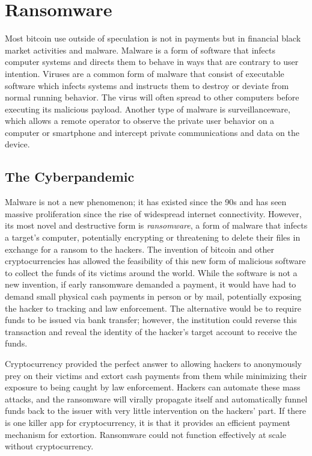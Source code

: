 \chapter{Ransomware}


Most bitcoin use outside of speculation is not in payments but in financial
black market activities and malware. Malware is a form of software that infects
computer systems and directs them to behave in ways that are contrary to user
intention. Viruses are a common form of malware that consist of executable
software which infects systems and instructs them to destroy or deviate from
normal running behavior. The virus will often spread to other computers before
executing its malicious payload. Another type of malware is surveillanceware,
which allows a remote operator to observe the private user behavior on a
computer or smartphone and intercept private communications and data on the
device.

\section{The Cyberpandemic}

Malware is not a new phenomenon; it has existed since the 90s and has seen
massive proliferation since the rise of widespread internet connectivity.
However, its most novel and destructive form is \textit{ransomware}, a form of
malware that infects a target's computer, potentially encrypting or threatening
to delete their files in exchange for a ransom to the hackers. The invention of
bitcoin and other cryptocurrencies has allowed the feasibility of this new form
of malicious software to collect the funds of its victims around the world.
While the software is not a new invention, if early ransomware demanded a
payment, it would have had to demand small physical cash payments in person or
by mail, potentially exposing the hacker to tracking and law enforcement. The
alternative would be to require funds to be issued via bank transfer; however,
the institution could reverse this transaction and reveal the identity of the
hacker's target account to receive the funds.


Cryptocurrency provided the perfect answer to allowing hackers to anonymously
prey on their victims and extort cash payments from them while minimizing their
exposure to being caught by law enforcement. Hackers can automate these mass
attacks, and the ransomware will virally propagate itself and automatically
funnel funds back to the issuer with very little intervention on the hackers'
part. If there is one killer app for cryptocurrency, it is that it provides an
efficient payment mechanism for extortion. Ransomware could not function
effectively at scale without cryptocurrency.

